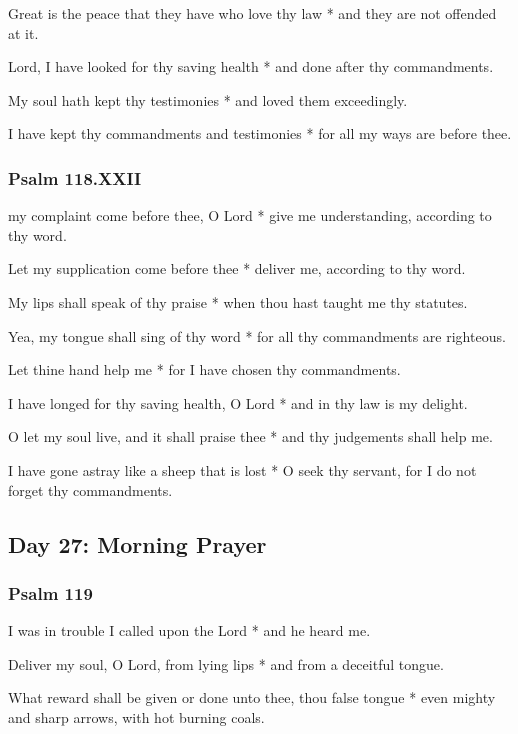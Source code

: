Great is the peace that they have who love thy law * and they are not offended at it.

Lord, I have looked for thy saving health * and done after thy commandments.

My soul hath kept thy testimonies * and loved them exceedingly.

I have kept thy commandments and testimonies * for all my ways are before thee.

\subsubsection{Psalm 118.XXII}

 my complaint come before thee, O Lord * give me understanding, according to thy word.

Let my supplication come before thee * deliver me, according to thy word.

My lips shall speak of thy praise * when thou hast taught me thy statutes.

Yea, my tongue shall sing of thy word * for all thy commandments are righteous.

Let thine hand help me * for I have chosen thy commandments.

I have longed for thy saving health, O Lord * and in thy law is my delight.

O let my soul live, and it shall praise thee * and thy judgements shall help me.

I have gone astray like a sheep that is lost * O seek thy servant, for I do not forget thy commandments.

\subsection{Day 27: Morning Prayer}

\subsubsection{Psalm 119}


 I was in trouble I called upon the Lord * and he heard me.

Deliver my soul, O Lord, from lying lips * and from a deceitful tongue.

What reward shall be given or done unto thee, thou false tongue * even mighty and sharp arrows, with hot burning coals.


